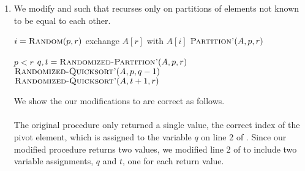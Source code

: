 \documentclass[11pt]{article}
\theoremstyle{nonumberplain}
\begin{document}
\begin{enumerate}
\item We modify  and  such that  recurses only on partitions of elements not known to be equal to
each other.
\begin{codebox}
\li $i=\textnormal{\scshape Random}(p,r)$
\li exchange $A[r]$ with $A[i]$
\li \Return $\textnormal{\scshape Partition'}(A,p,r)$
\end{codebox}  
\begin{codebox}
\li \If $p<r$ \Do
\li     $q,t=\textnormal{\scshape Randomized-Partition'}(A,p,r)$
\li     $\textnormal{\scshape Randomized-Quicksort'}(A,p,q-1)$
\li     $\textnormal{\scshape Randomized-Quicksort'}(A,t+1,r)$
    \End
\end{codebox}
We show the our modifications to  are correct as follows. \\
\\
The original  procedure only returned a single value, the correct index of the pivot element, which is assigned to the variable $q$ on line 2 of . Since our modified  procedure returns two values, we modified line 2 of  to include two variable assignments, $q$ and $t$, one for each return value. \\
\\

\end{enumerate}
\end{document}
